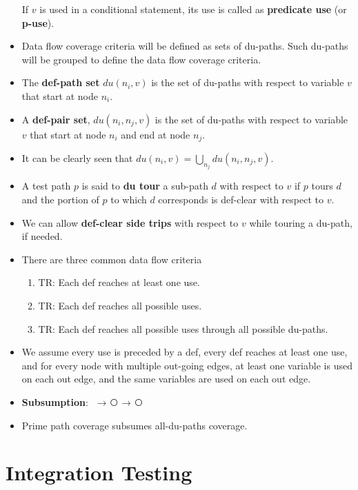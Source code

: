 \documentclass[a4paper]{article}
\begin{document}
\begin{itemize}
    If $v$ is used in a conditional statement, its use is called as \textbf{predicate use} (or \textbf{p-use}).
    \item Data flow coverage criteria will be defined as sets of du-paths. Such du-paths will be grouped to define the data flow coverage criteria.
    \item The \textbf{def-path set} $du(n_i,v)$ is the set of du-paths with respect to variable $v$ that start at node $n_i$.
    \item A \textbf{def-pair set}, $du(n_i,n_j,v)$ is the set of du-paths with respect to variable $v$ that start at node $n_i$ and end at node $n_j$.
    \item It can be clearly seen that $du(n_i,v)=\bigcup_{n_j}du(n_i,n_j,v)$.
    \item A test path $p$ is said to \textbf{du tour} a sub-path $d$ with respect to $v$ if $p$ tours $d$ and the portion of $p$ to which $d$ corresponds is def-clear with respect to $v$.
    \item We can allow \textbf{def-clear side trips} with respect to $v$ while touring a du-path, if needed.
    \item There are three common data flow criteria
    \begin{enumerate}
        \item TR: Each def reaches at least one use.\label{enum:ST-data-flow-1}
        \item TR: Each def reaches all possible uses.\label{enum:ST-data-flow-2}
        \item TR: Each def reaches all possible uses through all possible du-paths.\label{enum:ST-data-flow-3}
    \end{enumerate}
    \item We assume every use is preceded by a def, every def reaches at least one use, and for every node with multiple out-going edges, at least one variable is used on each out edge, and the same variables are used on each out edge.
    \item\textbf{Subsumption}: \textcircled{\raisebox{-0.9pt}{\ref{enum:ST-data-flow-3}}}$\rightarrow$\textcircled{\raisebox{-0.9pt}{\ref{enum:ST-data-flow-2}}}$\rightarrow$\textcircled{\raisebox{-0.9pt}{\ref{enum:ST-data-flow-1}}}
    \item Prime path coverage subsumes all-du-paths coverage.
\end{itemize}

\section{Integration Testing}
\end{document}

